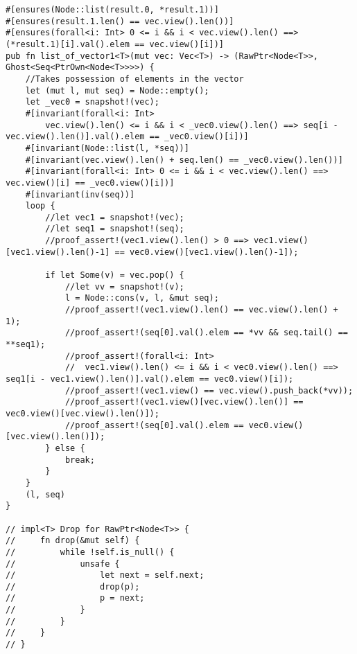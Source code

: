 \begin{verbatim}
#[ensures(Node::list(result.0, *result.1))]
#[ensures(result.1.len() == vec.view().len())]
#[ensures(forall<i: Int> 0 <= i && i < vec.view().len() ==> (*result.1)[i].val().elem == vec.view()[i])]
pub fn list_of_vector1<T>(mut vec: Vec<T>) -> (RawPtr<Node<T>>, Ghost<Seq<PtrOwn<Node<T>>>>) {
    //Takes possession of elements in the vector
    let (mut l, mut seq) = Node::empty();
    let _vec0 = snapshot!(vec);
    #[invariant(forall<i: Int>
        vec.view().len() <= i && i < _vec0.view().len() ==> seq[i - vec.view().len()].val().elem == _vec0.view()[i])]
    #[invariant(Node::list(l, *seq))]
    #[invariant(vec.view().len() + seq.len() == _vec0.view().len())]
    #[invariant(forall<i: Int> 0 <= i && i < vec.view().len() ==> vec.view()[i] == _vec0.view()[i])]
    #[invariant(inv(seq))]
    loop {
        //let vec1 = snapshot!(vec);
        //let seq1 = snapshot!(seq);
        //proof_assert!(vec1.view().len() > 0 ==> vec1.view()[vec1.view().len()-1] == vec0.view()[vec1.view().len()-1]);

        if let Some(v) = vec.pop() {
            //let vv = snapshot!(v);
            l = Node::cons(v, l, &mut seq);
            //proof_assert!(vec1.view().len() == vec.view().len() + 1);
            //proof_assert!(seq[0].val().elem == *vv && seq.tail() == **seq1);
            //proof_assert!(forall<i: Int>
            //  vec1.view().len() <= i && i < vec0.view().len() ==> seq1[i - vec1.view().len()].val().elem == vec0.view()[i]);
            //proof_assert!(vec1.view() == vec.view().push_back(*vv));
            //proof_assert!(vec1.view()[vec.view().len()] == vec0.view()[vec.view().len()]);
            //proof_assert!(seq[0].val().elem == vec0.view()[vec.view().len()]);
        } else {
            break;
        }
    }
    (l, seq)
}

// impl<T> Drop for RawPtr<Node<T>> {
//     fn drop(&mut self) {
//         while !self.is_null() {
//             unsafe {
//                 let next = self.next;
//                 drop(p);
//                 p = next;
//             }
//         }
//     }
// }

\end{verbatim}

\newpage
